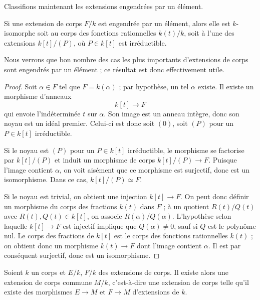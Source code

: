 \noindent
Classifions maintenant les extensions engendrées par un élément.

\begin{lemma}
\label{lemma-field-extension-generated-by-one-element}
Si une extension de corps $F/k$ est engendrée par un élément, alors elle est
$k$-isomorphe soit au corps des fonctions rationnelles $k(t)/k$, soit à l'une
des extensions $k[t]/(P)$, où $P \in k[t]$ est irréductible.
\end{lemma}

\noindent
Nous verrons que bon nombre des cas les plus importants d'extensions de corps sont
engendrés par un élément ; ce résultat est donc effectivement utile.

\begin{proof}
Soit $\alpha \in F$ tel que $F = k(\alpha)$ ; par hypothèse, un tel
$\alpha$ existe. Il existe un morphisme d'anneaux
$$
k[t] \to F
$$
qui envoie l'indéterminée $t$ sur $\alpha$. Son image est un anneau intègre, donc son
noyau est un idéal premier. Celui-ci est donc soit $(0)$, soit $(P)$ pour un $P \in k[t]$
irréductible.

\medskip\noindent
Si le noyau est $(P)$ pour un $P \in k[t]$ irréductible, le morphisme se factorise
par $k[t]/(P)$ et induit un morphisme de corps $k[t]/(P) \to F$. Puisque
l'image contient $\alpha$, on voit aisément que ce morphisme est surjectif, donc
est un isomorphisme. Dans ce cas, $k[t]/(P) \simeq F$.

\medskip\noindent
Si le noyau est trivial, on obtient une injection $k[t] \to F$.
On peut donc définir un morphisme du corps des fractions $k(t)$ dans $F$ ; à un
quotient $R(t)/Q(t)$ avec $R(t), Q(t) \in k[t]$, on associe
$R(\alpha)/Q(\alpha)$. L'hypothèse selon laquelle $k[t] \to F$ est injectif implique
que $Q(\alpha) \neq 0$, sauf si $Q$ est le polynôme nul.
Le corps des fractions de $k[t]$ est le corps des fonctions rationnelles $k(t)$ ; on obtient donc
un morphisme $k(t) \to F$
dont l'image contient $\alpha$. Il est par conséquent surjectif, donc est un isomorphisme.
\end{proof}

\begin{lemma}
\label{lemma-common-extension-field}
Soient $k$ un corps et $E/k$, $F/k$ des extensions de corps.
Il existe alors une extension de corps commune $M/k$, c'est-à-dire une extension
de corps telle qu'il existe des morphismes $E \to M$ et $F \to M$ d'extensions de $k$.
\end{lemma}

